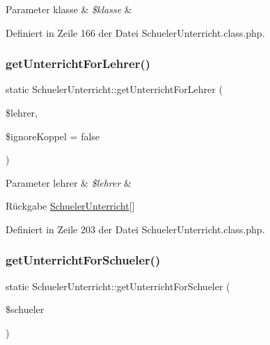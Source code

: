 \begin{DoxyParams}[1]{Parameter}
klasse & {\em \$klasse} & \\
\hline
\end{DoxyParams}


Definiert in Zeile 166 der Datei Schueler\+Unterricht.\+class.\+php.

\mbox{\label{class_schueler_unterricht_ad4ae41f543fbf950087e62a2364f2709}} 
\subsubsection{\texorpdfstring{get\+Unterricht\+For\+Lehrer()}{getUnterrichtForLehrer()}}
{\footnotesize\ttfamily static Schueler\+Unterricht\+::get\+Unterricht\+For\+Lehrer (\begin{DoxyParamCaption}\item[{}]{\$lehrer,  }\item[{}]{\$ignore\+Koppel = {\ttfamily false} }\end{DoxyParamCaption})\hspace{0.3cm}{\ttfamily [static]}}


\begin{DoxyParams}[1]{Parameter}
lehrer & {\em \$lehrer} & \\
\hline
\end{DoxyParams}
\begin{DoxyReturn}{Rückgabe}
\mbox{\hyperlink{class_schueler_unterricht}{Schueler\+Unterricht}}\mbox{[}\mbox{]} 
\end{DoxyReturn}


Definiert in Zeile 203 der Datei Schueler\+Unterricht.\+class.\+php.

\mbox{\label{class_schueler_unterricht_a18c5343468e13b95314404b64dedc070}} 
\subsubsection{\texorpdfstring{get\+Unterricht\+For\+Schueler()}{getUnterrichtForSchueler()}}
{\footnotesize\ttfamily static Schueler\+Unterricht\+::get\+Unterricht\+For\+Schueler (\begin{DoxyParamCaption}\item[{}]{\$schueler }\end{DoxyParamCaption})\hspace{0.3cm}{\ttfamily [static]}}


